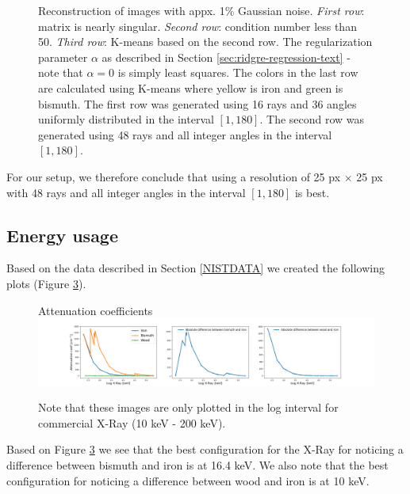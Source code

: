 \documentclass{article}
\begin{document}
\begin{figure}[H]
\begin{subfigure}[b]{0.45\linewidth}
    \label{fig:sub2}
  \end{subfigure}
  \caption{\small Reconstruction of images with appx. 1\% Gaussian noise. \emph{First row}: matrix is nearly singular. \emph{Second row}: condition number less than 50. \emph{Third row}: K-means based on the second row. The regularization parameter $\alpha$ as described in Section \ref{sec:ridgre-regression-text} - note that $\alpha = 0$ is simply least squares. The colors in the last row are calculated using K-means where yellow is iron and green is bismuth. The first row was generated using 16 rays and 36 angles uniformly distributed in the interval $[1,180]$. The second row was generated using 48 rays and all integer angles in the interval $[1, 180]$. }
  \label{fig:two-different-images-for-4.1}
\end{figure}

\noindent For our setup, we therefore conclude that using a resolution of 25 px $\times$ 25 px with 48 rays and all integer angles in the interval $[1, 180]$ is best.

\subsection{Energy usage}\label{sec:energy-usage}
Based on the data described in Section \ref{NISTDATA} we created the following plots (Figure \ref{fig:both-attenuation-coeff-plots}).
\vspace*{-0.1\baselineskip}
\begin{figure}[H]
    \centering
    \large{Attenuation coefficients} \\
    \includegraphics[scale=0.26]{images/combined-plot-attenuation.png}
    \caption{\small Note that these images are only plotted in the log interval for commercial X-Ray (10 keV - 200 keV).}
    \label{fig:both-attenuation-coeff-plots}
\end{figure} 
\vspace*{-0.2\baselineskip}
\noindent Based on Figure \ref{fig:both-attenuation-coeff-plots} we see that the best configuration for the X-Ray for noticing a difference between bismuth and iron is at 16.4 keV. We also note that the best configuration for noticing a difference between wood and iron is at 10 keV.  
\end{document}
